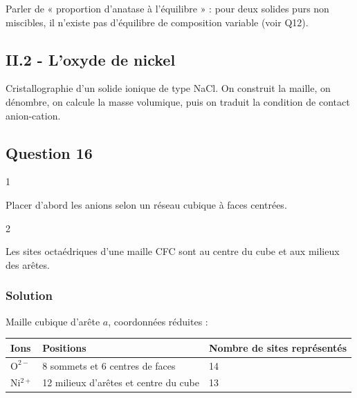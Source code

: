 \documentclass[11pt,a4paper]{article}
\begin{document}
\begin{piege}

Parler de « proportion d'anatase à l'équilibre » : pour deux solides purs non miscibles, il n'existe pas d'équilibre de composition variable (voir Q12).

\end{piege}

\hypertarget{ii.2---loxyde-de-nickel}{%
\subsection{II.2 - L'oxyde de nickel}\label{ii.2---loxyde-de-nickel}}

Cristallographie d'un solide ionique de type NaCl. On construit la maille, on dénombre, on calcule la masse volumique, puis on traduit la condition de contact anion-cation.

\hypertarget{question-16}{%
\subsection{Question 16}\label{question-16}}

\begin{indication}{1}

Placer d'abord les anions selon un réseau cubique à faces centrées.

\end{indication}

\begin{indication}{2}

Les sites octaédriques d'une maille CFC sont au centre du cube et aux milieux des arêtes.

\end{indication}

\hypertarget{solution-15}{%
\subsubsection{Solution}\label{solution-15}}

Maille cubique d'arête \(a\), coordonnées réduites :

\begin{longtable}[]{@{}lll@{}}
\toprule\noalign{}
Ions & Positions & Nombre de sites représentés \\
\midrule\noalign{}
\endhead
\bottomrule\noalign{}
\endlastfoot
\(\mathrm{O^{2-}}\) & 8 sommets et 6 centres de faces & 14 \\
\(\mathrm{Ni^{2+}}\) & 12 milieux d'arêtes et centre du cube & 13 \\
\end{longtable}
\end{document}
